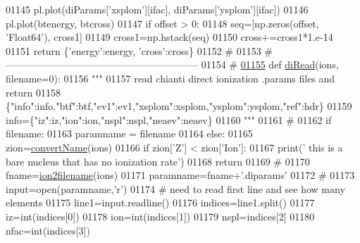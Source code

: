 \begin{DoxyCode}
{{{{{{{{{{{{01145                     pl.plot(diParams[\textcolor{stringliteral}{'xsplom'}][ifac], diParams[\textcolor{stringliteral}{'ysplom'}][ifac])
01146                     pl.plot(btenergy, btcross)
01147                 \textcolor{keywordflow}{if} offset > 0:
01148                     seq=[np.zeros(offset, \textcolor{stringliteral}{'Float64'}), cross1]
01149                     cross1=np.hstack(seq)
01150                 cross+=cross1*1.e-14
01151         \textcolor{keywordflow}{return} \{\textcolor{stringliteral}{'energy'}:energy, \textcolor{stringliteral}{'cross'}:cross\}
01152     \textcolor{comment}{#}
01153     \textcolor{comment}{#-----------------------------------------------------------}
01154     \textcolor{comment}{#}
\hypertarget{__chianti__tools_8py_source_l01155}{}\hyperlink{namespacepyneb_1_1utils_1_1__chianti__tools_a28552b5d18a1b604ed4512c435e648bc}{01155} \textcolor{keyword}{def }\hyperlink{namespacepyneb_1_1utils_1_1__chianti__tools_a28552b5d18a1b604ed4512c435e648bc}{diRead}(ions, filename=0):
01156     \textcolor{stringliteral}{"""}
01157 \textcolor{stringliteral}{    read chianti direct ionization .params files and return}
01158 \textcolor{stringliteral}{        \{"info":info,"btf":btf,"ev1":ev1,"xsplom":xsplom,"ysplom":ysplom,"ref":hdr\}}
01159 \textcolor{stringliteral}{        info=\{"iz":iz,"ion":ion,"nspl":nspl,"neaev":neaev\}}
01160 \textcolor{stringliteral}{    """}
01161     \textcolor{comment}{#}
01162     \textcolor{keywordflow}{if} filename:
01163         paramname = filename
01164     \textcolor{keywordflow}{else}:
01165         zion=\hyperlink{namespacepyneb_1_1utils_1_1__chianti__tools_a92cf299ad3407ee8923739e2761ab13f}{convertName}(ions)
01166         \textcolor{keywordflow}{if} zion[\textcolor{stringliteral}{'Z'}] < zion[\textcolor{stringliteral}{'Ion'}]:
01167             print(\textcolor{stringliteral}{' this is a bare nucleus that has no ionization rate'})
01168             \textcolor{keywordflow}{return}
01169         \textcolor{comment}{#}
01170         fname=\hyperlink{namespacepyneb_1_1utils_1_1__chianti__tools_ad4bc7b577fd4c3819ceb00b0a444351b}{ion2filename}(ions)
01171         paramname=fname+\textcolor{stringliteral}{'.diparams'}
01172     \textcolor{comment}{#}
01173     input=open(paramname,\textcolor{stringliteral}{'}\textcolor{stringliteral}{r')}
01174 \textcolor{stringliteral}{    }\textcolor{comment}{#  need to read first line and see how many elements}
01175     line1=input.readline()
01176     indices=line1.split()
01177     iz=int(indices[0])
01178     ion=int(indices[1])
01179     nspl=indices[2]
01180     nfac=int(indices[3])
}}}}}}}}}}}}
\end{DoxyCode}
